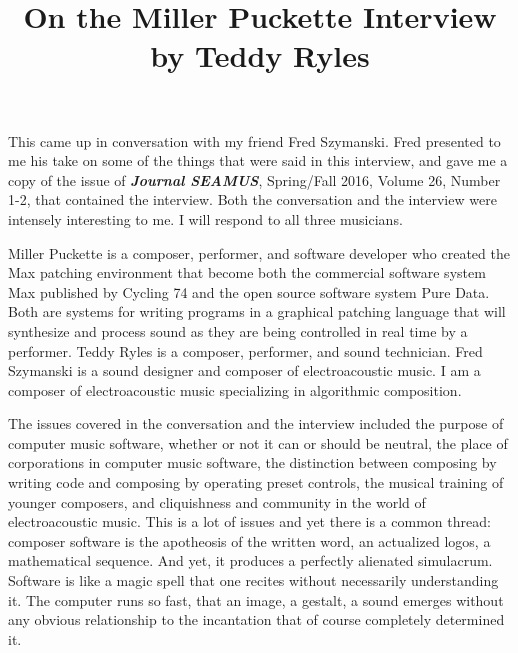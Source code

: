 \documentclass[a4paper,10pt]{article}
\title{On the Miller Puckette Interview by Teddy Ryles}
\author{}
\begin{document}
\maketitle

\begin{abstract}

\end{abstract}

\section{}
This came up in conversation with my friend Fred Szymanski. Fred presented to me his take on some of the things that were said in this interview, and gave me a copy of the issue of \textit{\textbf{Journal SEAMUS}}, Spring/Fall 2016, Volume 26, Number 1-2, that contained the interview. Both the conversation and the interview were intensely interesting to me. I will respond to all three musicians.

Miller Puckette is a composer, performer, and software developer who created the Max patching environment that become both the commercial software system Max published by Cycling 74 and the open source software system Pure Data. Both are systems for writing programs in a graphical patching language that will synthesize and process sound as they are being controlled in real time by a performer. Teddy Ryles is a composer, performer, and sound technician. Fred Szymanski is a sound designer and composer of electroacoustic music. I am a composer of electroacoustic music specializing in algorithmic composition.

The issues covered in the conversation and the interview included the purpose of computer music software, whether or not it can or should be neutral, the place of corporations in computer music software, the distinction between composing by writing code and composing by operating preset controls, the musical training of younger composers, and cliquishness and community in the world of electroacoustic music. This is a lot of issues and yet there is a common thread: composer software is the apotheosis of the written word, an actualized logos, a mathematical sequence. And yet, it produces a perfectly alienated simulacrum. Software is like a magic spell that one recites without necessarily understanding it. The computer runs so fast, that an image, a gestalt, a sound emerges without any obvious relationship to the incantation that of course completely determined it.
\end{document}

